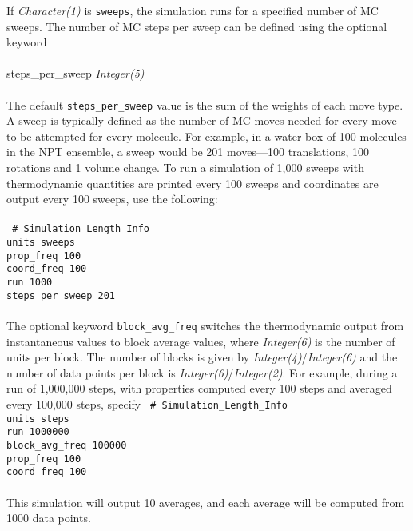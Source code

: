 %
If {\it Character(1)} is {\tt sweeps}, the simulation runs for a specified number of MC sweeps. 
The number of MC steps per sweep can be defined using the optional keyword \\ \\
%
steps\_per\_sweep {\it Integer(5)} \\ \\
%
The default \texttt{steps\_per\_sweep} value is the sum of the weights of each move type. 
A sweep is typically defined as the number of MC moves needed for every move to be attempted for every molecule.
For example, in a water box of 100 molecules in the NPT ensemble, a sweep would be 201 moves---100 translations,
100 rotations and 1 volume change.
To run a simulation of 1,000 sweeps with thermodynamic quantities are printed every 100 sweeps
and coordinates are output every 100 sweeps, use the following: \\ \\
%
\texttt{
\# Simulation\_Length\_Info \\
units             sweeps \\
prop\_freq        100 \\
coord\_freq       100 \\
run               1000 \\
steps\_per\_sweep 201 \\} \\
%
The optional keyword {\tt block\_avg\_freq} switches the thermodynamic output from instantaneous values
to block average values, where {\it Integer(6)} is the number of units per block.  
The number of blocks is given by {\it Integer(4)}/{\it Integer(6)} 
and the number of data points per block is {\it Integer(6)}/{\it Integer(2)}.
For example, during a run of 1,000,000 steps, with properties computed every 100 steps and 
averaged every 100,000 steps, specify
%
\texttt{
\# Simulation\_Length\_Info \\
units             steps \\
run               1000000 \\
block\_avg\_freq  100000 \\
prop\_freq        100 \\
coord\_freq       100 \\} \\
%
This simulation will output 10 averages, and each average will be computed from 1000 data points.
%
%
%
